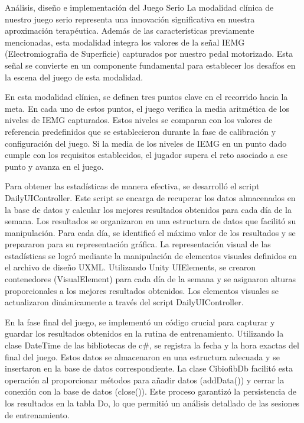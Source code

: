 \begin{thesischapter}{2} {Análisis, diseño e implementación del Juego Serio}
    La modalidad clínica de nuestro juego serio representa una innovación significativa en nuestra aproximación terapéutica. Además de las características previamente mencionadas, esta modalidad integra los valores de la señal IEMG (Electromiografía de Superficie) capturados por nuestro pedal motorizado. Esta señal se convierte en un componente fundamental para establecer los desafíos en la escena del juego de esta modalidad.

    \vspace{10pt}
    En esta modalidad clínica, se definen tres puntos clave en el recorrido hacia la meta. En cada uno de estos puntos, el juego verifica la media aritmética de los niveles de IEMG capturados. Estos niveles se comparan con los valores de referencia predefinidos que se establecieron durante la fase de calibración y configuración del juego. Si la media de los niveles de IEMG en un punto dado cumple con los requisitos establecidos, el jugador supera el reto asociado a ese punto y avanza en el juego.


    Para obtener las estadísticas de manera efectiva, se desarrolló el script DailyUIController. Este script se encarga de recuperar los datos almacenados en la base de datos y calcular los mejores resultados obtenidos para cada día de la semana. Los resultados se organizaron en una estructura de datos que facilitó su manipulación.
    Para cada día, se identificó el máximo valor de los resultados y se prepararon para su representación gráfica.
    La representación visual de las estadísticas se logró mediante la manipulación de elementos visuales definidos en el archivo de diseño UXML. Utilizando Unity 
    UIElements, se crearon contenedores (VisualElement) para cada día de la semana y se asignaron alturas proporcionales a los mejores resultados obtenidos. Los elementos 
    visuales se actualizaron dinámicamente a través del script DailyUIController.

    \vspace{10pt}
    En la fase final del juego, se implementó un código crucial para capturar y guardar los resultados obtenidos en la rutina de entrenamiento. Utilizando la clase DateTime de las bibliotecas de c\#, 
    se registra la fecha y la hora exactas del final del juego. Estos datos se almacenaron en una estructura adecuada y se insertaron en la base de datos correspondiente. La clase CibiofibDb facilitó esta 
    operación al proporcionar métodos para añadir datos (addData()) y cerrar la conexión con la base de datos (close()). Este proceso garantizó la persistencia de los resultados en la tabla Do, lo que 
    permitió un análisis detallado de las sesiones de entrenamiento.



\end{thesischapter}
